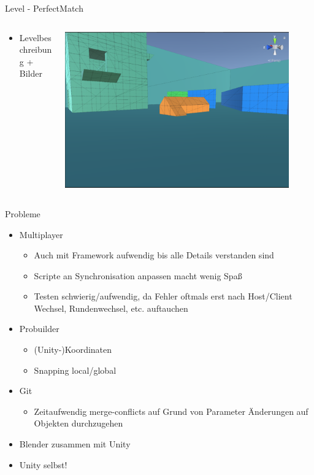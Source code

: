 \documentclass[xcolor=dvipsnames]{beamer}
\begin{document}
\begin{frame}{Level - PerfectMatch}
\begin{columns}
\begin{column}{0.5\textwidth}
	\begin{itemize}
		\item Levelbeschreibung + Bilder 
	\end{itemize}
\end{column}
\begin{column}{0.5\textwidth} 
	\begin{center}
		\includegraphics[width=0.9\textwidth]{Level_view.png}
	\end{center}
\end{column}
\end{columns}
\end{frame}

\begin{frame}{Probleme}
\begin{itemize}
 \item Multiplayer 
 	\begin{itemize}
 		\item Auch mit Framework aufwendig bis alle Details verstanden sind
 		\item Scripte an Synchronisation anpassen macht wenig Spaß
 		\item Testen schwierig/aufwendig, da Fehler oftmals erst nach Host/Client Wechsel, Rundenwechsel, etc. auftauchen
 	\end{itemize}
 \item Probuilder
 	\begin{itemize}
 		\item (Unity-)Koordinaten 
 		\item Snapping local/global
 	\end{itemize}
  \item Git
 	\begin{itemize}
 		\item Zeitaufwendig merge-conflicts auf Grund von Parameter Änderungen auf Objekten durchzugehen
 	\end{itemize}
  \item Blender zusammen mit Unity 
  \item Unity selbst!
\end{itemize}
	
\end{frame}
\end{document}
